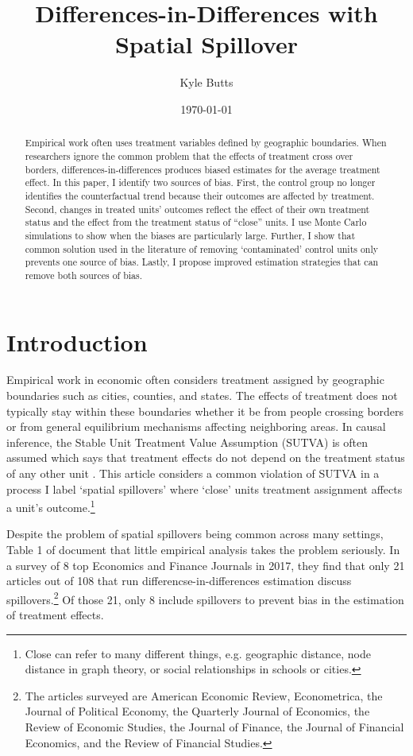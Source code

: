 \documentclass[11pt]{article}
\title{Differences-in-Differences with Spatial Spillover}
\date{\today}
\author{Kyle Butts}
\begin{document}
\maketitle
\begin{abstract}
    Empirical work often uses treatment variables defined by geographic boundaries. When researchers ignore the common problem that the effects of treatment cross over borders, differences-in-differences produces biased estimates for the average treatment effect. In this paper, I identify two sources of bias. First, the control group no longer identifies the counterfactual trend because their outcomes are affected by treatment. Second, changes in treated units' outcomes reflect the effect of their own treatment status and the effect from the treatment status of ``close'' units. I use Monte Carlo simulations to show when the biases are particularly large. Further, I show that common solution used in the literature of removing `contaminated' control units only prevents one source of bias. Lastly, I propose improved estimation strategies that can remove both sources of bias.  
\end{abstract}

\newpage 

\section{Introduction}
Empirical work in economic often considers treatment assigned by geographic boundaries such as cities, counties, and states. The effects of treatment does not typically stay within these boundaries whether it be from people crossing borders or from general equilibrium mechanisms affecting neighboring areas. 
In causal inference, the Stable Unit Treatment Value Assumption (SUTVA) is often assumed which says that treatment effects do not depend on the treatment status of any other unit \citep{Rubin_1980}. This article considers a common violation of SUTVA in a process I label `spatial spillovers' where `close' units treatment assignment affects a unit's outcome.\footnote{Close can refer to many different things, e.g. geographic distance, node distance in graph theory, or social relationships in schools or cities.} 

Despite the problem of spatial spillovers being common across many settings, Table 1 of \citet{Berg_Streitz_2019} document that little empirical analysis takes the problem seriously. In a survey of 8 top Economics and Finance Journals in 2017, they find that only 21 articles out of 108 that run differencse-in-differences estimation discuss spillovers.\footnote{The articles surveyed are American Economic Review, Econometrica, the Journal of Political Economy, the Quarterly Journal of Economics, the Review of Economic Studies, the Journal of Finance, the Journal of Financial Economics, and the Review of Financial Studies.} Of those 21, only 8 include spillovers to prevent bias in the estimation of treatment effects.
\end{document}
